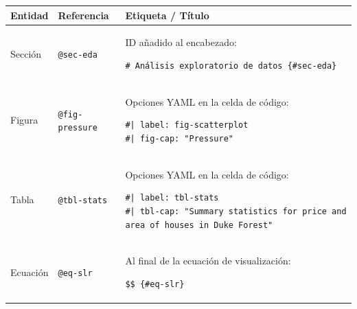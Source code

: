 \documentclass[
  spanish,
  12pt,
  letterpaper,
  DIV=11,
  numbers=noendperiod]{scrreprt}
\newcounter{none} %
\begin{document}
{\def\LTcaptype{none} %
\begin{longtable}[]{@{}
  >{\raggedright\arraybackslash}p{}
  >{\raggedright\arraybackslash}p{}
  >{\raggedright\arraybackslash}p{}@{}}
\toprule\noalign{}
\begin{minipage}[b]{\linewidth}\raggedright
Entidad
\end{minipage} & \begin{minipage}[b]{\linewidth}\raggedright
Referencia
\end{minipage} & \begin{minipage}[b]{\linewidth}\raggedright
Etiqueta / Título
\end{minipage} \\
\midrule\noalign{}
\endhead
\bottomrule\noalign{}
\endlastfoot
Sección & \texttt{@sec-eda} &
\begin{minipage}[t]{\linewidth}\raggedright
ID añadido al encabezado:

\begin{verbatim}
# Análisis exploratorio de datos {#sec-eda}
\end{verbatim}
\end{minipage} \\
Figura & \texttt{@fig-pressure} &
\begin{minipage}[t]{\linewidth}\raggedright
Opciones YAML en la celda de código:

\begin{verbatim}
#| label: fig-scatterplot
#| fig-cap: "Pressure"
\end{verbatim}
\end{minipage} \\
Tabla & \texttt{@tbl-stats} &
\begin{minipage}[t]{\linewidth}\raggedright
Opciones YAML en la celda de código:

\begin{verbatim}
#| label: tbl-stats
#| tbl-cap: "Summary statistics for price and area of houses in Duke Forest"
\end{verbatim}
\end{minipage} \\
Ecuación & \texttt{@eq-slr} &
\begin{minipage}[t]{\linewidth}\raggedright
Al final de la ecuación de visualización:

\begin{verbatim}
$$ {#eq-slr}
\end{verbatim}
\end{minipage} \\
\end{longtable}
}
\end{document}
